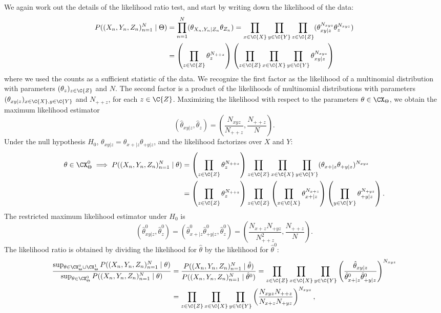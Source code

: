 We again work out the details of the likelihood ratio test, and 
start by writing down the likelihood of the data:
\begin{equation*}\begin{split}
  P((X_n,Y_n,Z_n)_{n=1}^N \mid \Theta) 
  &= \prod_{n=1}^N (\theta_{X_n,Y_n|Z_n} \theta_{Z_n}) 
   = \prod_{x\in\C{X}} \prod_{y\in\C{Y}} \prod_{z\in\C{Z}} (\theta_{xy|z}^{N_{xyz}} \theta_z^{N_{xyz}}) \\
  &= \left( \prod_{z \in \C{Z}} \theta_z^{N_{+ + z}} \right) \left(\prod_{z \in \C{Z}}\prod_{x\in\C{X}} \prod_{y\in\C{Y}} \theta_{xy|z}^{N_{xyz}}\right)
\end{split}\end{equation*}
where we used the counts as a sufficient statistic of the data. 
We recognize the first factor as the likelihood of a multinomial
distribution with parameters $(\theta_z)_{z\in\C{Z}}$ and $N$.
The second factor is a product of the likelihoods
of multinomial distributions with parameters $(\theta_{xy|z})_{x\in\C{X},y\in\C{Y}}$ and $N_{++ z}$,
for each $z \in \C{Z}$.
Maximizing the likelihood with respect to the parameters $\theta \in \CX_\Theta$, we obtain the maximum likelihood estimator
$$\left(\hat \theta_{xy|z},\hat \theta_z\right) = \left(\frac{N_{xyz}}{N_{++ z}},\frac{N_{++ z}}{N}\right).$$
Under the null hypothesis $H_0$, $\theta_{xy|z} = \theta_{x+|z}\theta_{+ y|z}$, and the likelihood factorizes over $X$
and $Y$:
\begin{equation*}\begin{split}
  \theta \in \CX_\Theta^0 \implies P((X_n,Y_n,Z_n)_{n=1}^N \mid \theta) 
  &= \left( \prod_{z \in \C{Z}} \theta_z^{N_{+ + z}} \right) \prod_{z \in \C{Z}}\prod_{x\in\C{X}} \prod_{y\in\C{Y}} (\theta_{x+|z} \theta_{+ y|z})^{N_{xyz}} \\
  &= \left( \prod_{z \in \C{Z}} \theta_z^{N_{+ + z}} \right) \prod_{z \in \C{Z}} \left(\prod_{x\in\C{X}} \theta_{x+|z}^{N_{x+ z}} \right) \left(\prod_{y\in\C{Y}} \theta_{+ y|z}^{N_{+ yz}} \right).
\end{split}\end{equation*}
The restricted maximum likelihood estimator under $H_0$ is 
$$\left(\hat \theta^0_{xy|z},\hat \theta^0_z\right) = \left(\hat \theta^0_{x+|z} \hat \theta^0_{+ y|z},\hat \theta^0_z\right) = \left(\frac{N_{x+ z} N_{+ y z}}{N_{++ z}^2},\frac{N_{++ z}}{N}\right).$$
The likelihood ratio is obtained by dividing the likelihood for $\hat \theta$ by the likelihood for $\hat \theta^0$:
\begin{equation*}\begin{split}
\frac{\sup_{\theta\in\CX_\Theta^0\cup\CX_\Theta^1} P((X_n,Y_n,Z_n)_{n=1}^N \mid \theta)}{\sup_{\theta\in\CX_\Theta^0} P((X_n,Y_n,Z_n)_{n=1}^N \mid \theta)}
  & = \frac{P((X_n,Y_n,Z_n)_{n=1}^N \mid \hat\theta)}{P((X_n,Y_n,Z_n)_{n=1}^N \mid \hat\theta^0)}
    = \prod_{z\in\C{Z}} \prod_{x\in\C{X}} \prod_{y\in\C{Y}} \left(\frac{\hat \theta_{xy|z}}{\hat \theta^0_{x+|z} \hat \theta^0_{+ y|z}}\right)^{N_{xyz}} \\
  & = \prod_{z\in\C{Z}} \prod_{x\in\C{X}} \prod_{y\in\C{Y}} \left(\frac{N_{xyz} N_{++ z}}{N_{x+ z} N_{+ y z}}\right)^{N_{xyz}},
\end{split}\end{equation*}
